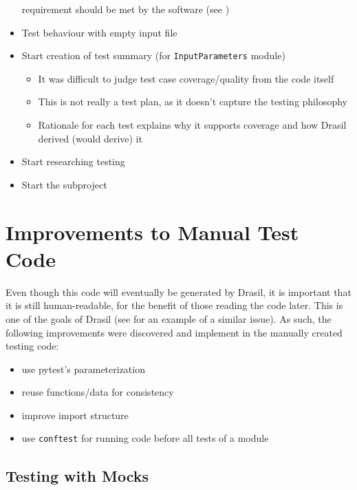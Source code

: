 \begin{itemize}
            requirement should be met by the software
            (see )
      \item Test behaviour with empty input file
      \item Start creation of test summary (for \texttt{InputParameters} module)
            \begin{itemize}
                  \item It was difficult to judge test case coverage/quality from
                        the code itself
                  \item This is not really a test plan, as it doesn't capture the
                        testing philosophy
                  \item Rationale for each test explains why it supports coverage
                        and how Drasil derived (would derive) it
            \end{itemize}
      \item Start researching testing
      \item Start the  subproject
\end{itemize}

\section{Improvements to Manual Test Code}

Even though this code will eventually be generated by Drasil, it is important
that it is still human-readable, for the benefit of those reading the code
later. This is one of the goals of Drasil (see  for an example
of a similar issue). As such, the following improvements were discovered and
implement in the manually created testing code:

\begin{itemize}
      \item use pytest's parameterization
      \item reuse functions/data for consistency
      \item improve import structure
      \item use \texttt{conftest} for running code before all tests of a module
\end{itemize}

\subsection{Testing with Mocks}

